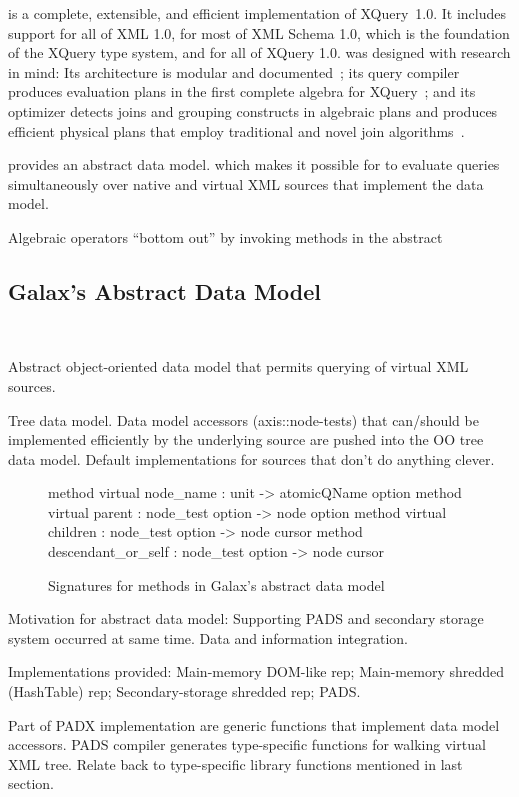 \Galax{} is a complete, extensible, and efficient implementation of
XQuery~1.0.  It includes support for all of XML 1.0, for most of XML
Schema 1.0, which is the foundation of the XQuery type system, and for
all of XQuery 1.0.  \Galax{} was designed with research in mind: Its
architecture is modular and documented~\cite{edbt2004}; its query
compiler produces evaluation plans in the first complete algebra for
XQuery~\cite{icde2006}; and its optimizer detects joins and grouping
constructs in algebraic plans and produces efficient physical plans
that employ traditional and novel join algorithms~\cite{icde2006}.

\Galax{} provides an abstract data model.  which makes it possible for
\Galax{} to evaluate queries simultaneously over native and virtual
XML sources that implement the data model.   

Algebraic operators
``bottom out'' by invoking methods in the abstract 


\subsection{Galax's Abstract Data Model}

~\cite{xquerydm}

Abstract object-oriented data model that permits querying of virtual
XML sources.  

Tree data model.  Data model accessors (axis::node-tests) that can/should be implemented
efficiently by the underlying source are pushed into the OO tree data
model.  Default implementations for sources that don't do anything
clever.   
\begin{figure*}
\begin{small}
\begin{code}
  method virtual node_name  : unit -> atomicQName option
  method virtual parent     : node_test option -> node option
  method virtual children   : node_test option -> node cursor
  method descendant_or_self : node_test option -> node cursor
\end{code}
\end{small}
\caption{Signatures for methods in Galax's abstract data model}
\end{figure*}

Motivation for abstract data model: Supporting PADS and secondary
storage system occurred at same time.  Data and information
integration.  

Implementations provided: Main-memory DOM-like rep; Main-memory
shredded (HashTable) rep; Secondary-storage shredded rep; PADS.

Part of PADX implementation are generic functions that implement data
model accessors.  PADS compiler generates type-specific functions for
walking virtual XML tree.  Relate back to type-specific library
functions mentioned in last section.

